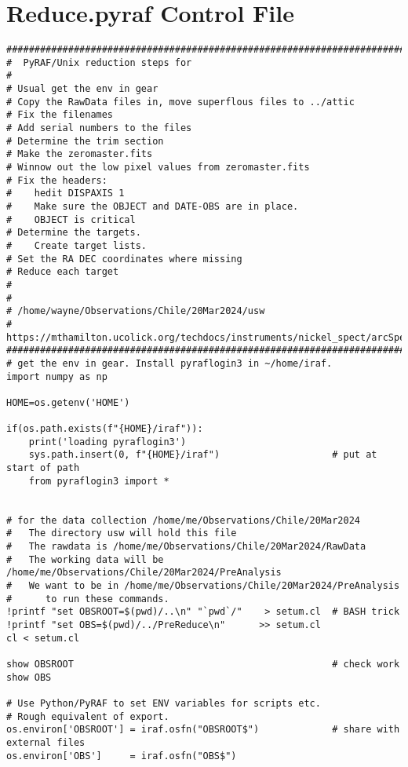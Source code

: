 \section{Reduce.pyraf Control File} \label{sec:ReducePyrafControlFile}

\begingroup \fontsize{10pt}{10pt}
\selectfont
\begin{verbatim} 
#############################################################################
#  PyRAF/Unix reduction steps for 
# 
# Usual get the env in gear
# Copy the RawData files in, move superflous files to ../attic
# Fix the filenames
# Add serial numbers to the files
# Determine the trim section
# Make the zeromaster.fits
# Winnow out the low pixel values from zeromaster.fits
# Fix the headers:
#    hedit DISPAXIS 1
#    Make sure the OBJECT and DATE-OBS are in place.
#    OBJECT is critical
# Determine the targets.
#    Create target lists.
# Set the RA DEC coordinates where missing
# Reduce each target
# 
# 
# /home/wayne/Observations/Chile/20Mar2024/usw
# https://mthamilton.ucolick.org/techdocs/instruments/nickel_spect/arcSpectra/
#############################################################################
# get the env in gear. Install pyraflogin3 in ~/home/iraf.
import numpy as np

HOME=os.getenv('HOME')

if(os.path.exists(f"{HOME}/iraf")):
    print('loading pyraflogin3')
    sys.path.insert(0, f"{HOME}/iraf")                    # put at start of path
    from pyraflogin3 import *


# for the data collection /home/me/Observations/Chile/20Mar2024
#   The directory usw will hold this file
#   The rawdata is /home/me/Observations/Chile/20Mar2024/RawData
#   The working data will be /home/me/Observations/Chile/20Mar2024/PreAnalysis
#   We want to be in /home/me/Observations/Chile/20Mar2024/PreAnalysis
#      to run these commands.
!printf "set OBSROOT=$(pwd)/..\n" "`pwd`/"    > setum.cl  # BASH trick
!printf "set OBS=$(pwd)/../PreReduce\n"      >> setum.cl
cl < setum.cl

show OBSROOT                                              # check work
show OBS

# Use Python/PyRAF to set ENV variables for scripts etc.
# Rough equivalent of export.
os.environ['OBSROOT'] = iraf.osfn("OBSROOT$")             # share with external files
os.environ['OBS']     = iraf.osfn("OBS$")


\end{verbatim}
